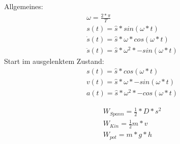 \documentclass{article}
\begin{document}
Allgemeines:
\begin{gather*}
    \omega = \frac{2*\pi}{T}\\
    s(t) = \hat{s} * sin(\omega*t)\\
    \dot{s}(t) = \hat{s} * \omega * cos(\omega*t)\\
    \ddot{s}(t) = \hat{s} * \omega^2 * -sin(\omega*t)
\end{gather*}
Start im ausgelenktem Zustand:
\begin{gather*}
    s(t) = \hat{s} * cos(\omega*t)\\
    v(t) = \hat{s} * \omega * -sin(\omega*t)\\
    a(t) = \hat{s} * \omega^2 * -cos(\omega*t)
\end{gather*}

\begin{gather*}
    W_{Spann} = \frac{1}{2} * D * s^2\\
    W_{Kin} = \frac{1}{2}  m * v\\
    W_{pot} = m*g*h
\end{gather*}
\end{document}
